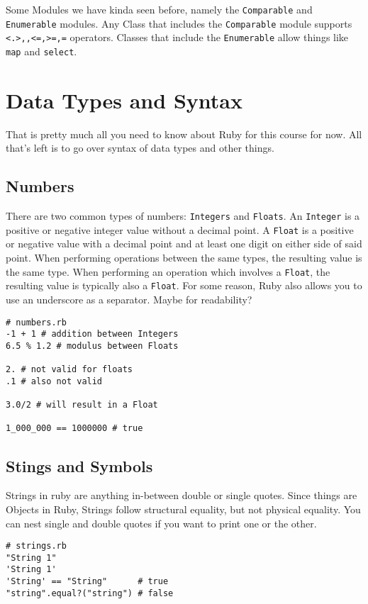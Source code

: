 \documentclass[main.tex]{subfiles}
\begin{document}
Some Modules we have kinda seen before, namely the \texttt{Comparable} and \texttt{Enumerable} modules. Any Class that includes the \texttt{Comparable} module supports \texttt{<.>,,<=,>=,=} operators. Classes that include the \texttt{Enumerable} allow things like \texttt{map} and \texttt{select}. 

\section{Data Types and Syntax}\label{ruby-syntax}
That is pretty much all you need to know about Ruby for this course for now.
All that's left is to go over syntax of data types and other things.

\subsection{Numbers}
There are two common types of numbers: \texttt{Integers} and \texttt{Floats}. 
An \texttt{Integer} is a positive or negative integer value without a decimal point. 
A \texttt{Float} is a positive or negative value with a decimal point and at least one digit on either side of said point.
When performing operations between the same types, the resulting value is the same type. 
When performing an operation which involves a \texttt{Float}, the resulting value is typically also a \texttt{Float}. 
For some reason, Ruby also allows you to use an underscore as a separator. Maybe for readability?
\begin{lstlisting}[style=MyRubyStyle]
# numbers.rb
-1 + 1 # addition between Integers
6.5 % 1.2 # modulus between Floats

2. # not valid for floats
.1 # also not valid

3.0/2 # will result in a Float

1_000_000 == 1000000 # true
\end{lstlisting}

\subsection{Stings and Symbols}
Strings in ruby are anything in-between double or single quotes.
Since things are Objects in Ruby, Strings follow structural equality, but not physical equality. 
You can nest single and double quotes if you want to print one or the other.
\begin{lstlisting}[style=MyRubyStyle]
# strings.rb
"String 1"
'String 1'
'String' == "String"      # true
"string".equal?("string") # false
\end{lstlisting}
\end{document}
